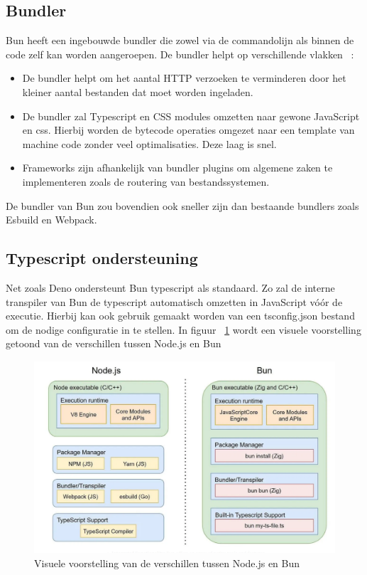 \subsection{Bundler}
Bun heeft een ingebouwde bundler die zowel via de commandolijn als binnen de code zelf kan worden aangeroepen. 
De bundler helpt op verschillende vlakken ~\autocite{McDonnel2023}:
\begin{itemize}
    \item De bundler helpt om het aantal HTTP verzoeken te verminderen door het kleiner aantal bestanden dat moet worden ingeladen.
    \item De bundler zal Typescript en CSS modules omzetten naar gewone JavaScript en css. 
    Hierbij worden de bytecode operaties omgezet naar een template van machine code zonder veel optimalisaties. Deze laag is snel.
    \item Frameworks zijn afhankelijk van bundler plugins om algemene zaken te implementeren zoals de routering van bestandssystemen.
\end{itemize}
De bundler van Bun zou bovendien ook sneller zijn dan bestaande bundlers zoals Esbuild en Webpack.

\subsection{Typescript ondersteuning}
Net zoals Deno ondersteunt Bun typescript als standaard. 
Zo zal de interne transpiler van Bun de typescript automatisch omzetten in JavaScript vóór de executie.
Hierbij kan ook gebruik gemaakt worden van een tsconfig.json bestand om de nodige configuratie in te stellen.
In figuur ~\ref{fig:nodevbun} wordt een visuele voorstelling getoond van de verschillen tussen Node.js en Bun

\begin{figure}[H]
    \centering
    \includegraphics[width=.9\textwidth]{graphics/nodevbun.png}
    \caption{\label{fig:nodevbun}Visuele voorstelling van de verschillen tussen Node.js en Bun ~\autocite{Aghdasi2023}}
\end{figure}

